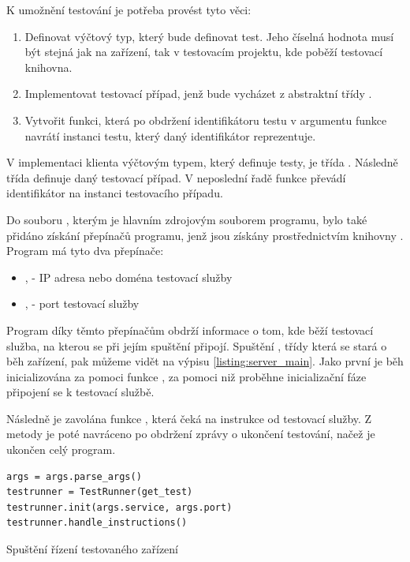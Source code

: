 K umožnění testování je potřeba provést tyto věci:

\begin{enumerate}
    \item Definovat výčtový typ, který bude definovat test. Jeho číselná hodnota musí být stejná jak na zařízení, tak v testovacím projektu, kde poběží testovací knihovna.
    \item Implementovat testovací případ, jenž bude vycházet z abstraktní třídy .
    \item Vytvořit funkci, která po obdržení identifikátoru testu v argumentu funkce navrátí instanci testu, který daný identifikátor reprezentuje.
\end{enumerate}


V implementaci klienta výčtovým typem, který definuje testy, je třída . Následně třída  definuje daný testovací případ. V neposlední řadě funkce  převádí identifikátor na instanci testovacího případu. 

Do souboru , kterým je hlavním zdrojovým souborem programu, bylo také přidáno získání přepínačů programu, jenž jsou získány prostřednictvím knihovny . Program má tyto dva přepínače:

\begin{itemize}
    \item {},  - IP adresa nebo doména testovací služby
    \item {},  - port testovací služby
\end{itemize}

Program díky těmto přepínačům obdrží informace o tom, kde běží testovací služba, na kterou se při jejím spuštění připojí. Spuštění , třídy která se stará o běh zařízení, pak můžeme vidět na výpisu \ref{listing:server_main}. Jako první je běh inicializována za pomoci funkce , za pomoci niž proběhne inicializační fáze připojení se k testovací službě. 

Následně je zavolána funkce , která čeká na instrukce od testovací služby. Z metody je poté navráceno po obdržení zprávy o ukončení testování, načež je ukončen celý program. 


\begin{listing}[htbp]
    \centering
    \begin{verbatim}
args = args.parse_args()
testrunner = TestRunner(get_test)
testrunner.init(args.service, args.port)
testrunner.handle_instructions()
    \end{verbatim}
\caption{Spuštění řízení testovaného zařízení}
\label{listing:server_main}
\end{listing}


